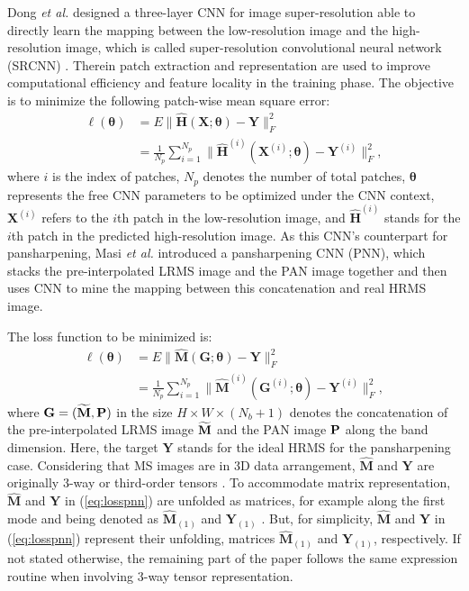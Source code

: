 \documentclass[journal]{IEEEtran}
\begin{document}
Dong \emph{et al.} designed a three-layer CNN for image super-resolution able to directly learn the mapping between the low-resolution image and the high-resolution image, which is called super-resolution convolutional neural network (SRCNN) \cite{SuperRes-CNN:Dong2016}. Therein patch extraction and representation are used to improve computational efficiency and feature locality in the training phase. The objective is to minimize the following patch-wise mean square error:
\begin{equation}
\label{eq:losssrcnn}
\begin{split}
\ell(\pmb{\theta}) &= E \|\widehat{\mathbf{H}}(\mathbf{X};\pmb{\theta}) - \mathbf{Y}\|^2_F\\
&= \frac{1}{N_p} \sum_{i=1}^{N_p} \|\widehat{\mathbf{H}}^{(i)}(\mathbf{X}^{(i)};\pmb{\theta}) - \mathbf{Y}^{(i)}\|^2_F,
\end{split}
\end{equation}
where $i$ is the index of patches, $N_p$ denotes the number of total patches, $\pmb{\theta}$ represents the free CNN parameters to be optimized under the CNN context, $\mathbf{X}^{(i)}$ refers to the $i$th patch in the low-resolution image, and $\widehat{\mathbf{H}}^{(i)}$ stands for the $i$th patch in the predicted high-resolution image. As this CNN's counterpart for pansharpening, Masi  \emph{et al.} introduced a pansharpening CNN (PNN)\cite{CNN-Pansharp:Masi2016}, which stacks the pre-interpolated LRMS image and the PAN image together and then uses CNN to mine the mapping between this concatenation and real HRMS image.

The loss function to be minimized is:
\begin{equation}
\label{eq:losspnn}
\begin{split}
\ell(\pmb{\theta})  &= E\|{\widehat{\mathbf {M}}}({\mathbf{G}};\pmb{\theta}) - {\mathbf{Y}}\|^2_F\\
&= \frac{1}{N_p} \sum_{i=1}^{N_p} \|{\widehat {\mathbf {M}}}^{(i)}({\mathbf{G}^{(i)}};\pmb{\theta}) - {\mathbf{Y}^{(i)}}\|^2_F,
\end{split}
\end{equation}
where ${\bf{G} = ({\bf \widetilde{M}},\bf P})$ in the size $H \times W \times (N_b+1)$ denotes the concatenation of the pre-interpolated LRMS image $\bf \widetilde{M}$ and the PAN image $\bf P$ along the band dimension. Here, the target $\mathbf{Y}$ stands for the ideal HRMS for the pansharpening case. Considering that MS images are in 3D data arrangement, $\widehat{\mathbf {M}}$ and $\mathbf{Y}$ are originally 3-way or third-order tensors \cite{kolda2009tensor}. To accommodate matrix representation, $\widehat{\mathbf {M}}$ and $\mathbf{Y}$ in (\ref{eq:losspnn}) are unfolded as matrices, for example along the first mode and being denoted as $\widehat{\mathbf {M}}_{(1)}$ and $\mathbf{Y}_{(1)}$ \cite{kolda2009tensor}. But, for simplicity, $\widehat{\mathbf {M}}$ and $\mathbf{Y}$ in (\ref{eq:losspnn}) represent their unfolding, matrices $\widehat{\mathbf {M}}_{(1)}$ and $\mathbf{Y}_{(1)}$, respectively. If not stated otherwise, the remaining part of the paper follows the same expression routine when involving 3-way tensor representation.
\end{document}
